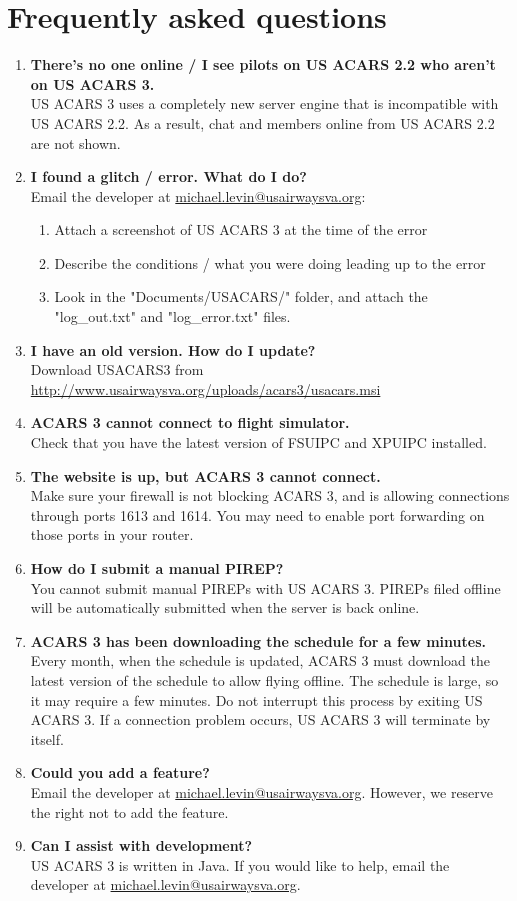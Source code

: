 \documentclass[12pt]{article}
\begin{document}
\section{Frequently asked questions}
\begin{enumerate}
\item{\textbf{There’s no one online / I see pilots on US ACARS 2.2 who aren’t on US ACARS 3.}\\
US ACARS 3 uses a completely new server engine that is incompatible with US ACARS 2.2. As a result, chat and members online from US ACARS 2.2 are not shown. }
\item{\textbf{I found a glitch / error. What do I do?}\\
Email the developer at \url{michael.levin@usairwaysva.org}:
\begin{enumerate}
\item{Attach a screenshot of US ACARS 3 at the time of the error}
\item{Describe the conditions / what you were doing leading up to the error}
\item{Look in the "Documents/USACARS/" folder, and attach the "log\_out.txt" and "log\_error.txt" files.}
\end{enumerate}
}
\item{\textbf{I have an old version. How do I update?}\\
Download USACARS3 from \url{http://www.usairwaysva.org/uploads/acars3/usacars.msi}}
\item{\textbf{ACARS 3 cannot connect to flight simulator.}\\
Check that you have the latest version of FSUIPC and XPUIPC installed.}
\item{\textbf{The website is up, but ACARS 3 cannot connect.}\\
Make sure your firewall is not blocking ACARS 3, and is allowing connections through ports 1613 and 1614. You may need to enable port forwarding on those ports in your router.}
\item{\textbf{How do I submit a manual PIREP?}\\
You cannot submit manual PIREPs with US ACARS 3. PIREPs filed offline will be automatically submitted when the server is back online.}
\item{\textbf{ACARS 3 has been downloading the schedule for a few minutes.}\\
Every month, when the schedule is updated, ACARS 3 must download the latest version of the schedule to allow flying offline. The schedule is large, so it may require a few minutes. Do not interrupt this process by exiting US ACARS 3. If a connection problem occurs, US ACARS 3 will terminate by itself. }
\item{\textbf{Could you add a feature?} \\
Email the developer at \url{michael.levin@usairwaysva.org}. However, we reserve the right not to add the feature.}
\item{\textbf{Can I assist with development?}\\
US ACARS 3 is written in Java. If you would like to help, email the developer at \url{michael.levin@usairwaysva.org}.}
\end{enumerate}
\end{document}

